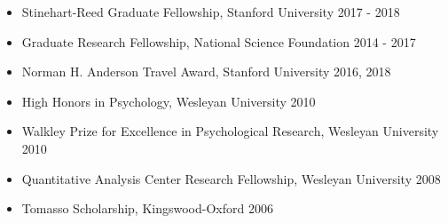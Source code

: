 \documentclass[10pt]{article}
\newenvironment{outerlist}[1][\enskip\textbullet]%
        {\begin{itemize}[#1,leftmargin=*]}{\end{itemize}%
         \vspace{-.6\baselineskip}}
\begin{document}
\begin{outerlist}
\item[] Stinehart-Reed Graduate Fellowship, Stanford University \hfill 2017 - 2018
\item[] Graduate Research Fellowship, National Science Foundation \hfill 2014 - 2017
\item[] Norman H. Anderson Travel Award, Stanford University \hfill 2016, 2018
\item[] High Honors in Psychology, Wesleyan University \hfill 2010
\item[] Walkley Prize for Excellence in Psychological Research, Wesleyan University \hfill 2010
\item[] Quantitative Analysis Center Research Fellowship, Wesleyan University \hfill 2008
\item[] Tomasso Scholarship, Kingswood-Oxford \hfill 2006
\end{outerlist}


\vspace{.1in}
\end{document}
